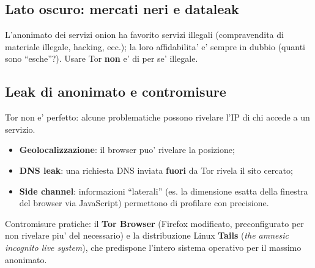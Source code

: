 \subsection{Lato oscuro: mercati neri e dataleak}
L'anonimato dei servizi onion ha favorito servizi illegali (compravendita di materiale illegale, hacking, ecc.); la loro affidabilita' e' sempre in dubbio (quanti sono ``esche''?). Usare Tor \textbf{non} e' di per se' illegale.

\subsection{Leak di anonimato e contromisure}
Tor non e' perfetto: alcune problematiche possono rivelare l'IP di chi accede a un servizio.
\begin{itemize}
  \item \textbf{Geolocalizzazione}: il browser puo' rivelare la posizione;
  \item \textbf{DNS leak}: una richiesta DNS inviata \textbf{fuori} da Tor rivela il sito cercato;
  \item \textbf{Side channel}: informazioni ``laterali'' (es. la dimensione esatta della finestra del browser via JavaScript) permettono di profilare con precisione.
\end{itemize}
Contromisure pratiche: il \textbf{Tor Browser} (Firefox modificato, preconfigurato per non rivelare piu' del necessario) e la distribuzione Linux \textbf{Tails} (\textit{the amnesic incognito live system}), che predispone l'intero sistema operativo per il massimo anonimato.

% 
